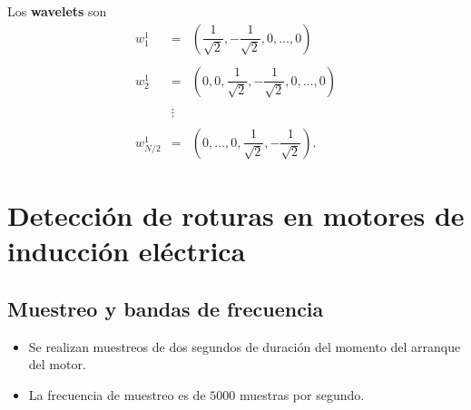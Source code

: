 Los \textbf{wavelets} son
$$
\begin{array}{rcl}
	w_1^1 &=&\left(\dfrac{1}{\sqrt{2}},-\dfrac{1}{\sqrt{2}},0,\ldots,0\right)\\\\
	w_2^1 &=& \left(0,0,\dfrac{1}{\sqrt{2}},-\dfrac{1}{\sqrt{2}},0,\ldots,0\right)\\\\
	&\vdots&\\\\
	w_{N/2}^1 &=& \left(0,\ldots,0,\dfrac{1}{\sqrt{2}},-\dfrac{1}{\sqrt{2}}\right).
\end{array}
$$




\chapter{Detección de roturas en motores de inducción eléctrica}

\section{Muestreo y bandas de frecuencia}
\begin{itemize}
    \item Se realizan muestreos de dos segundos de duración del momento del arranque del motor.
    \item La frecuencia de muestreo es de $5000$ muestras por segundo.
\end{itemize}

